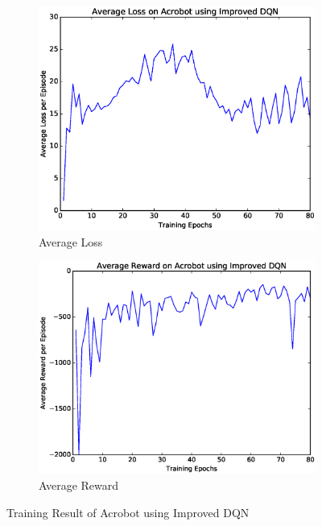 \documentclass[a4paper,UTF8]{article}
\theoremstyle{definition}
\begin{document}
\begin{figure}[htbp]
	\centering
	\begin{subfigure}[t]{0.5\textwidth}
		\centering
		\includegraphics[scale=0.35]{figures/bot-idqn-loss}
		\caption{Average Loss}
	\end{subfigure}%
	\begin{subfigure}[t]{0.5\textwidth}
		\centering
		\includegraphics[scale=0.35]{figures/bot-idqn-reward}
		\caption{Average Reward}
	\end{subfigure}
	\caption{Training Result of Acrobot using Improved DQN}\label{fig:bot-idqn}
\end{figure}
\end{document}
